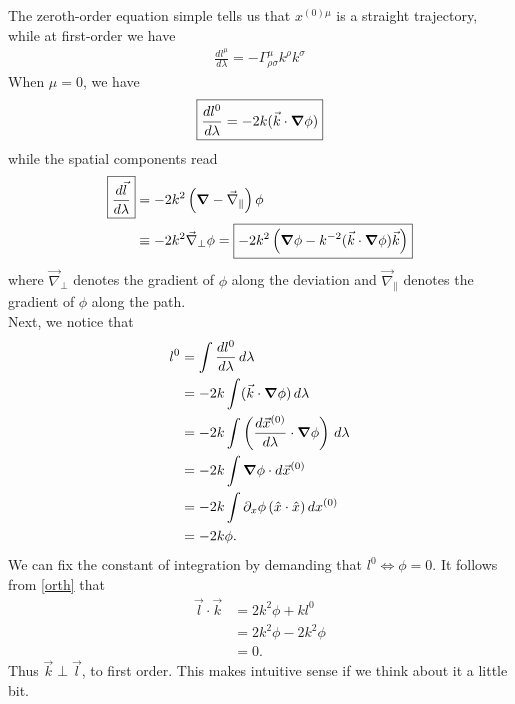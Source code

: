 \documentclass{book}
\theoremstyle{definition}
\newcommand{\p}{\partial}
\newcommand{\nn}{\nonumber}
\newcommand{\f}[2]{\frac{#1}{#2}}
\newcommand{\lp}{\left(}
\newcommand{\rp}{\right)}
\begin{document}
The zeroth-order equation simple tells us that $x^{(0)\mu}$ is a straight trajectory, while at first-order we have
\begin{align}
\boxed{\f{d l^\mu}{d\lambda} = -\Gamma^\mu_{\rho\sigma}k^\rho k^\sigma}
\end{align}
When $\mu= 0$, we have
\begin{align}
\boxed{\f{d l^0}{d\lambda} = -2k(\vec{k}\cdot \grad{\phi})}
\end{align}
while the spatial components read
\begin{align}\label{rotate}
\boxed{\f{d\vec{l}}{d\lambda}} &= -2k^2\lp \grad - \vec{\nabla}_\parallel \rp  \phi \nn\\
&\equiv -2k^2\vec{\nabla}_\perp \phi = \boxed{-2k^2\lp \grad{\phi} - k^{-2}(\vec{k}\cdot \grad{\phi})\vec{k} \rp}
\end{align}
where $\vec{\nabla}_\perp$ denotes the gradient of $\phi$ along the deviation and $\vec{\nabla}_\parallel$ denotes the gradient of $\phi$ along the path. \\

 
Next, we notice that
\begin{align}
l^0 &= \int \f{dl^0}{d\lambda}\,d\lambda\nn\\
&= -2k\int (\vec{k}\cdot \grad{\phi})\,d\lambda\nn\\
&= -2k\int \lp \f{d \vec{x}^{(0)}}{d\lambda}\cdot \grad{\phi}\rp\,d\lambda\nn\\
&= -2k\int \grad{\phi}\cdot d\vec{x}^{(0)}\nn\\
&= -2k\int \p_x \phi \,(\hat{x}\cdot \hat{x})\, d{x}^{(0)}\nn\\
&= -2k \phi.
\end{align}
We can fix the constant of integration by demanding that $l^0 \iff \phi= 0$. It follows from \eqref{orth} that
\begin{align}
\vec{l}\cdot \vec{k} &= 2k^2\phi+ kl^0\nn\\
&=2k^2\phi - 2k^2\phi \nn\\
&= 0.
\end{align}
Thus $\vec{k}\perp \vec{l}$, to first order. This makes intuitive sense if we think about it a little bit.\\
\end{document}
